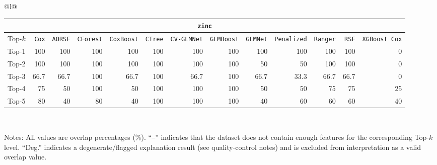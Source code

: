 \begin{longtable}{@{}l@{}}
\begin{tabular}{@{}l*{12}{r}@{}}
\multicolumn{13}{c}{\texttt{zinc}} \\
\midrule
Top-$k$ & \texttt{Cox} & \texttt{AORSF} & \texttt{CForest} & \texttt{CoxBoost} & \texttt{CTree} & \texttt{CV-GLMNet} & \texttt{GLMBoost} & \texttt{GLMNet} & \texttt{Penalized} & \texttt{Ranger} & \texttt{RSF} & \texttt{XGBoost Cox} \\
\midrule
Top-1 & 100 & 100 & 100 & 100 & 100 & 100 & 100 & 100 & 100 & 100 & 100 & 0 \\
Top-2 & 100 & 100 & 100 & 100 & 100 & 100 & 100 & 50 & 50 & 100 & 100 & 0 \\
Top-3 & 66.7 & 66.7 & 100 & 66.7 & 100 & 66.7 & 100 & 66.7 & 33.3 & 66.7 & 66.7 & 0 \\
Top-4 & 75 & 50 & 100 & 50 & 100 & 100 & 100 & 50 & 50 & 75 & 75 & 25 \\
Top-5 & 80 & 40 & 80 & 40 & 100 & 100 & 100 & 40 & 60 & 60 & 60 & 40 \\
\end{tabular} \\
\midrule

\end{longtable}

\vspace{1mm}
\begin{minipage}{\textwidth}
\footnotesize
Notes: All values are overlap percentages (\%). ``--'' indicates that the dataset does not contain enough features for the corresponding Top-$k$ level. ``Deg.'' indicates a degenerate/flagged explanation result (see quality-control notes) and is excluded from interpretation as a valid overlap value.
\end{minipage}